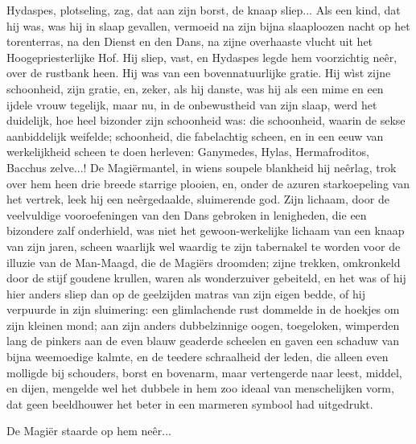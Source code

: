 \documentclass[a4paper, 12pt, oneside, dutch]{article}
\begin{document}
Hydaspes, plotseling, zag, dat aan zijn borst, de knaap sliep... Als een kind, dat hij was, was hij in slaap gevallen, vermoeid na zijn bijna slaaploozen nacht op het torenterras, na den Dienst en den Dans, na zijne overhaaste vlucht uit het Hoogepriesterlijke Hof. Hij sliep, vast, en Hydaspes legde hem voorzichtig neêr, over de rustbank heen. Hij was van een bovennatuurlijke gratie. Hij wìst zijne schoonheid, zijn gratie, en, zeker, als hij danste, was hij als een mime en een ijdele vrouw tegelijk, maar nu, in de onbewustheid van zijn slaap, werd het duidelijk, hoe heel bizonder zijn schoonheid was: die schoonheid, waarin de sekse aanbiddelijk weifelde; schoonheid, die fabelachtig scheen, en in een eeuw van werkelijkheid scheen te doen herleven: Ganymedes, Hylas, Hermafroditos, Bacchus zelve...! De Magiërmantel, in wiens soupele blankheid hij neêrlag, trok over hem heen drie breede starrige plooien, en, onder de azuren starkoepeling van het vertrek, leek hij een neêrgedaalde, sluimerende god. Zijn lichaam, door de veelvuldige vooroefeningen van den Dans gebroken in lenigheden, die een bizondere zalf onderhield, was niet het gewoon-werkelijke lichaam van een knaap van zijn jaren, scheen waarlijk wel waardig te zijn tabernakel te worden voor de illuzie van de Man-Maagd, die de Magiërs droomden; zijne trekken, omkronkeld door de stijf goudene krullen, waren als wonderzuiver gebeiteld, en het was of hij hier anders sliep dan op de geelzijden matras van zijn eigen bedde, of hij verpuurde in zijn sluimering: een glimlachende rust dommelde in de hoekjes om zijn kleinen mond; aan zijn anders dubbelzinnige oogen, toegeloken, wimperden lang de pinkers aan de even blauw geaderde scheelen en gaven een schaduw van bijna weemoedige kalmte, en de teedere schraalheid der leden, die alleen even molligde bij schouders, borst en bovenarm, maar vertengerde naar leest, middel, en dijen, mengelde wel het dubbele in hem zoo ideaal van menschelijken vorm, dat geen beeldhouwer het beter in een marmeren symbool had uitgedrukt.

De Magiër staarde op hem neêr...
\end{document}
